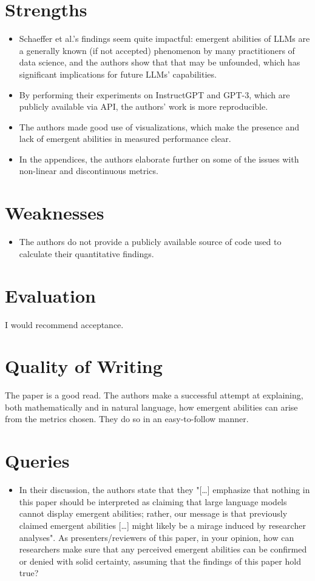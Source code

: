 \documentclass{IEEEtran}
\begin{document}
\section{Strengths}
\begin{itemize}
    \item Schaeffer et al.'s findings seem quite impactful: emergent abilities of LLMs are a generally known (if not accepted) phenomenon by many practitioners of data science, and the authors show that that may be unfounded, which has significant implications for future LLMs' capabilities.
    \item By performing their experiments on InstructGPT and GPT-3, which are publicly available via API, the authors' work is more reproducible.
    \item The authors made good use of visualizations, which make the presence and lack of emergent abilities in measured performance clear.
    \item In the appendices, the authors elaborate further on some of the issues with non-linear and discontinuous metrics.
\end{itemize}

\section{Weaknesses}
\begin{itemize}
    \item The authors do not provide a publicly available source of code used to calculate their quantitative findings.
\end{itemize}

\section{Evaluation}
I would recommend acceptance.

\section{Quality of Writing}
The paper is a good read.
The authors make a successful attempt at explaining, both mathematically and in natural language, how emergent abilities can arise from the metrics chosen.
They do so in an easy-to-follow manner.

\section{Queries}
\begin{itemize}
    \item In their discussion, the authors state that they "[\dots] emphasize that nothing in this paper should be interpreted as claiming that large language models cannot display emergent abilities; rather, our message is that previously claimed emergent abilities [\dots] might likely be a mirage induced by researcher analyses". As presenters/reviewers of this paper, in your opinion, how can researchers make sure that any perceived emergent abilities can be confirmed or denied with solid certainty, assuming that the findings of this paper hold true?
\end{itemize}
\end{document}
